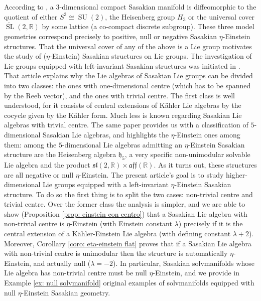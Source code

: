 \documentclass[12pt, twoside]{amsart}
\def\h{\mathfrak{h}}
\def\R{\mathbb{R}}
\DeclareMathOperator{\SL}{\operatorname{SL}}
\DeclareMathOperator{\SU}{\operatorname{SU}}
\newcommand{\iso}{\cong}
\theoremstyle{definition}
\begin{document}
According to \cite{Geiges}, a $3$-dimensional compact Sasakian manifold is diffeomorphic to the quotient of either $S^{3}\iso \SU(2)$, the Heisenberg group $H_3$ or the universal cover $\widetilde{\SL}(2,\R)$ by some lattice (a co-compact discrete subgroup). 
These three model geometries correspond precisely to positive, null or negative Sasakian $\eta$-Einstein structures. That  the universal cover of any of the above is a Lie group motivates the study of ($\eta$-Einstein) Sasakian structures on Lie groups. The investigation of Lie groups equipped with left-invariant Sasakian structures was initiated in \cite{AFV}. That article explains why the Lie algebras of Sasakian Lie groups can be divided into two classes: the ones with one-dimensional centre (which has to be spanned by the Reeb vector), and the ones with trivial centre. The first class is well understood, for it consists of central extensions of K{\"a}hler Lie algebras by the cocycle given by the K{\"a}hler form. Much less is known regarding Sasakian Lie algebras with trivial centre. The same paper provides us with a classification of $5$-dimensional Sasakian Lie algebras, and highlights the $\eta$-Einstein ones among them: among the $5$-dimensional Lie algebras admitting an $\eta$-Einstein Sasakian structure are the Heisenberg algebra $\h_5$, a very specific non-unimodular solvable Lie algebra 
and the product $\mathfrak{sl}(2,\R)\times \mathfrak{aff}(\R)$. 
As it turns out, these structures are all negative or null $\eta$-Einstein.\smallbreak
The present article's goal is to study higher-dimensional Lie groups equipped with a left-invariant $\eta$-Einstein Sasakian structure. To do so the first thing is to split the two cases: non-trivial centre and trivial centre. Over the former class the analysis is simpler, and we are able to show (Proposition \ref{prop: einstein con centro}) that a Sasakian Lie algebra with non-trivial centre is $\eta$-Einstein (with Einstein constant $\lambda$) precisely if it is the central extension of a K{\"a}hler-Einstein Lie algebra (with defining constant $\lambda+2$). Moreover, Corollary \ref{coro: eta-einstein flat} proves that if a Sasakian Lie algebra with non-trivial centre is unimodular then the structure is automatically $\eta$-Einstein, and actually null ($\lambda=-2$). In particular, Sasakian solvmanifolds whose Lie algebra has non-trivial centre must be null $\eta$-Einstein, and we provide in Example \ref{ex: null solvmanifold} original examples of solvmanifolds equipped with null $\eta$-Einstein Sasakian geometry. \par
\end{document}
